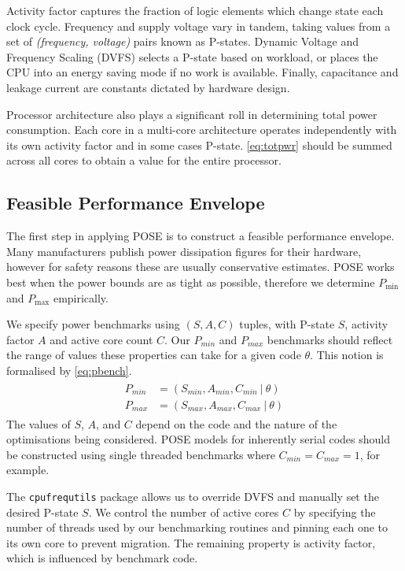 Activity factor captures the fraction of logic elements which change state each clock cycle.
Frequency and supply voltage vary in tandem, taking values from a set of \textit{(frequency, voltage)} pairs known as P-states.
Dynamic Voltage and Frequency Scaling (DVFS) selects a P-state based on workload, or places the CPU into an energy saving mode if no work is available.
Finally, capacitance and leakage current are constants dictated by hardware design.

Processor architecture also plays a significant roll in determining total power consumption.
Each core in a multi-core architecture operates independently with its own activity factor and in some cases P-state.
\autoref{eq:totpwr} should be summed across all cores to obtain a value for the entire processor.

\subsection{Feasible Performance Envelope}
\noindent
The first step in applying POSE is to construct a feasible performance envelope.
Many manufacturers publish power dissipation figures for their hardware, however for safety reasons these are usually conservative estimates.
POSE works best when the power bounds are as tight as possible, therefore we determine $P_{\min}$ and $P_{\max}$ empirically.

We specify power benchmarks using $(S,A,C)$ tuples, with P-state $S$, activity factor $A$ and active core count $C$.
Our $P_{min}$ and $P_{max}$ benchmarks should reflect the range of values these properties can take for a given code $\theta$.
This notion is formalised by \autoref{eq:pbench}.
\begin{align}
  \label{eq:pbench}
  \begin{split}
    P_{min} &= (S_{min}, A_{min}, C_{min}~\vert~\theta) \\
    P_{max} &= (S_{max}, A_{max}, C_{max}~\vert~\theta) 
  \end{split}
\end{align}
The values of $S$, $A$, and $C$ depend on the code and the nature of the optimisations being considered.
POSE models for inherently serial codes should be constructed using single threaded benchmarks where $C_{min} = C_{max} = 1$, for example.

The \texttt{cpufrequtils} package allows us to override DVFS and manually set the desired P-state $S$.
We control the number of active cores $C$ by specifying the number of threads used by our benchmarking routines and pinning each one to its own core to prevent migration.
The remaining property is activity factor, which is influenced by benchmark code.

